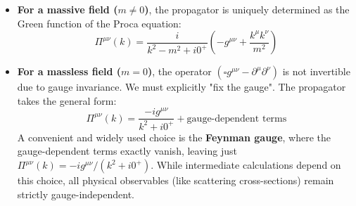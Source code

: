 \begin{itemize}
    \item \textbf{For a massive field (\(m \neq 0\))}, the propagator is uniquely determined as the Green function of the Proca equation:
          \[
              \Pi^{\mu\nu}(k) = \frac{i}{k^2 - m^2 + i0^+} \left( -g^{\mu\nu} + \frac{k^\mu k^\nu}{m^2} \right)
          \]
    \item \textbf{For a massless field (\(m = 0\))}, the operator \((\square g^{\mu\nu} - \partial^\mu \partial^\nu)\) is not invertible due to gauge invariance. We must explicitly "fix the gauge". The propagator takes the general form:
          \[
              \Pi^{\mu\nu}(k) = \frac{-i g^{\mu\nu}}{k^2 + i0^+} + \text{gauge-dependent terms}
          \]
          A convenient and widely used choice is the \textbf{Feynman gauge}, where the gauge-dependent terms exactly vanish, leaving just \(\Pi^{\mu\nu}(k) = -i g^{\mu\nu} / (k^2 + i0^+)\). While intermediate calculations depend on this choice, all physical observables (like scattering cross-sections) remain strictly gauge-independent.
\end{itemize}